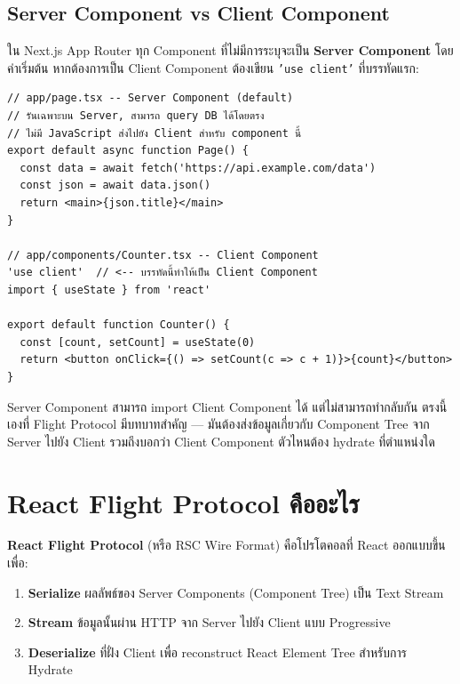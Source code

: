 \documentclass[12pt,oneside]{report}
\begin{document}
\newpage

\subsection{Server Component vs Client Component}

ใน Next.js App Router ทุก Component ที่ไม่มีการระบุจะเป็น \textbf{Server Component} โดยค่าเริ่มต้น หากต้องการเป็น Client Component ต้องเขียน \texttt{'use client'} ที่บรรทัดแรก:

\begin{lstlisting}[language={[Sharp]C}, caption=ตัวอย่าง Server Component และ Client Component]
// app/page.tsx -- Server Component (default)
// รันเฉพาะบน Server, สามารถ query DB ได้โดยตรง
// ไม่มี JavaScript ส่งไปยัง Client สำหรับ component นี้
export default async function Page() {
  const data = await fetch('https://api.example.com/data')
  const json = await data.json()
  return <main>{json.title}</main>
}

// app/components/Counter.tsx -- Client Component
'use client'  // <-- บรรทัดนี้ทำให้เป็น Client Component
import { useState } from 'react'

export default function Counter() {
  const [count, setCount] = useState(0)
  return <button onClick={() => setCount(c => c + 1)}>{count}</button>
}
\end{lstlisting}

Server Component สามารถ import Client Component ได้ แต่ไม่สามารถทำกลับกัน ตรงนี้เองที่ Flight Protocol มีบทบาทสำคัญ — มันต้องส่งข้อมูลเกี่ยวกับ Component Tree จาก Server ไปยัง Client รวมถึงบอกว่า Client Component ตัวไหนต้อง hydrate ที่ตำแหน่งใด

\newpage

\section{React Flight Protocol คืออะไร}

\textbf{React Flight Protocol} (หรือ RSC Wire Format) คือโปรโตคอลที่ React ออกแบบขึ้นเพื่อ:
\begin{enumerate}
    \item \textbf{Serialize} ผลลัพธ์ของ Server Components (Component Tree) เป็น Text Stream
    \item \textbf{Stream} ข้อมูลนั้นผ่าน HTTP จาก Server ไปยัง Client แบบ Progressive
    \item \textbf{Deserialize} ที่ฝั่ง Client เพื่อ reconstruct React Element Tree สำหรับการ Hydrate
\end{enumerate}
\end{document}
